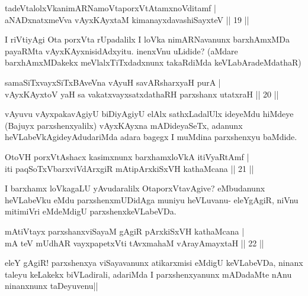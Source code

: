 \begin{shl}
tadeVtalolxVkanimARNamoVtaporxVtAtamxnoVditamf |\\
aNADxnatxmeVva vAyxKAyxtaM kimanayxdavashiSayxteV \hfill || 19 ||
\end{shl}

\begin{artha}
I riVtiyAgi Ota porxVta rUpadalilx I loVka nimARNavanunx barxhAmxMDa payaRMta vAyxKAyxnisidAdxyitu. inenxVnu uLidide? (aMdare barxhAmxMDakekx meVlalxTiTxdadxnunx takaRdiMda keVLabAradeMdathaR)
\end{artha}


\begin{shl}
samaSiTxvayxSiTxBAveVna vAyuH savARsharxyaH purA |\\
vAyxKAyxtoV yaH sa vakatxvayxsatxdathaRH parxshanx utatxraH \hfill || 20 ||
\end{shl}

\begin{artha}
vAyuvu vAyxpakavAgiyU biDiyAgiyU elAlx sathxLadalUlx ideyeMdu hiMdeye (Bajuyx parxshenxyalilx) vAyxKAyxna mADideyaSeTx, adanunx heVLabeVkAgideyAdudariMda adara bagegx I muMdina parxshenxyu baMdide.
\end{artha}

\begin{shl}
OtoVH porxVtAshacx kasimxnunx barxhamxloVkA itiVyaRtAmf |\\
iti paqSoTxV\s barxviVdArxgiR mA\s tipArxkiSxVH kathaMcana \hfill || 21 ||
\end{shl}

\begin{artha}
I barxhamx loVkagaLU yAvudaralilx OtaporxVtavAgive? eMbudanunx heVLabeVku eMdu parxshenxmUDidAga muniyu heVLuvanu- eleYgAgiR, niVnu mitimiVri eMdeMdigU parxshenxkeVLabeVDa.
\end{artha}


\begin{shl}
mA\s tiVtayx parxshanxviSayaM gAgiR pArxkiSxVH kathaMcana |\\
mA teV mUdhAR vayxpapetxVti tAvxmahaM vArayAmayxtaH \hfill || 22 ||
\end{shl}

\begin{artha}
eleY gAgiR! parxshenxya viSayavanunx atikarxmisi eMdigU keVLabeVDa, ninanx taleyu keLakekx biVLadirali, adariMda I parxshenxyanunx mADadaMte nAnu ninanxnunx taDeyuvenu||
\end{artha}

